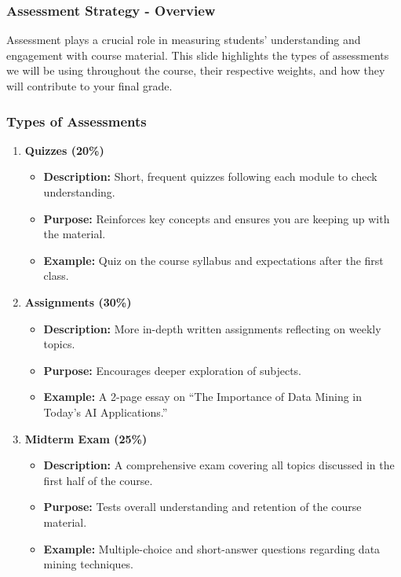 \documentclass[aspectratio=169]{beamer}
\begin{document}
\begin{frame}[fragile]
    \frametitle{Assessment Strategy - Overview}
    Assessment plays a crucial role in measuring students' understanding and engagement with course material. This slide highlights the types of assessments we will be using throughout the course, their respective weights, and how they will contribute to your final grade.
\end{frame}

\begin{frame}[fragile]
    \frametitle{Types of Assessments}
    \begin{enumerate}
        \item \textbf{Quizzes (20\%)}
            \begin{itemize}
                \item \textbf{Description:} Short, frequent quizzes following each module to check understanding.
                \item \textbf{Purpose:} Reinforces key concepts and ensures you are keeping up with the material.
                \item \textbf{Example:} Quiz on the course syllabus and expectations after the first class.
            \end{itemize}

        \item \textbf{Assignments (30\%)}
            \begin{itemize}
                \item \textbf{Description:} More in-depth written assignments reflecting on weekly topics.
                \item \textbf{Purpose:} Encourages deeper exploration of subjects.
                \item \textbf{Example:} A 2-page essay on “The Importance of Data Mining in Today's AI Applications.”
            \end{itemize}

        \item \textbf{Midterm Exam (25\%)}
            \begin{itemize}
                \item \textbf{Description:} A comprehensive exam covering all topics discussed in the first half of the course.
                \item \textbf{Purpose:} Tests overall understanding and retention of the course material.
                \item \textbf{Example:} Multiple-choice and short-answer questions regarding data mining techniques.
            \end{itemize}


\end{enumerate}
\end{frame}
\end{document}
